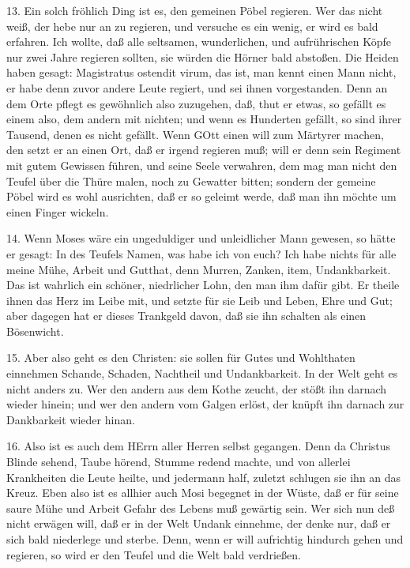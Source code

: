 13. Ein solch fröhlich Ding ist es, den gemeinen Pöbel regieren. Wer das nicht weiß, der hebe nur an zu regieren, und versuche es ein wenig, er wird es bald erfahren. Ich wollte, daß alle seltsamen, wunderlichen, und aufrührischen Köpfe nur zwei Jahre regieren sollten, sie würden die Hörner bald abstoßen. Die Heiden haben gesagt: Magistratus ostendit virum, das ist, man kennt einen Mann nicht, er habe denn zuvor andere Leute regiert, und sei ihnen vorgestanden. Denn an dem Orte pflegt es gewöhnlich also zuzugehen, daß, thut er etwas, so gefällt es einem also, dem andern mit nichten; und wenn es Hunderten gefällt, so sind ihrer Tausend, denen es nicht gefällt. Wenn GOtt einen will zum Märtyrer machen, den setzt er an einen Ort, daß er irgend regieren muß; will er denn sein Regiment mit gutem Gewissen führen, und seine Seele verwahren, dem mag man nicht den Teufel über die Thüre malen, noch zu Gewatter bitten; sondern der gemeine Pöbel wird es wohl ausrichten, daß er so geleimt werde, daß man ihn möchte um einen Finger wickeln.

14. Wenn Moses wäre ein ungeduldiger und unleidlicher Mann gewesen, so hätte er gesagt: In des Teufels Namen, was habe ich von euch? Ich habe nichts für alle meine Mühe, Arbeit und Gutthat, denn Murren, Zanken, item, Undankbarkeit. Das ist wahrlich ein schöner, niedrlicher Lohn, den man ihm dafür gibt. Er theile ihnen das Herz im Leibe mit, und setzte für sie Leib und Leben, Ehre und Gut; aber dagegen hat er dieses Trankgeld davon, daß sie ihn schalten als einen Bösenwicht.

15. Aber also geht es den Christen: sie sollen für Gutes und Wohlthaten einnehmen Schande, Schaden, Nachtheil und Undankbarkeit. In der Welt geht es nicht anders zu. Wer den andern aus dem Kothe zeucht, der stößt ihn darnach wieder hinein; und wer den andern vom Galgen erlöst, der knüpft ihn darnach zur Dankbarkeit wieder hinan.

16. Also ist es auch dem HErrn aller Herren selbst gegangen. Denn da Christus Blinde sehend, Taube hörend, Stumme redend machte, und von allerlei Krankheiten die Leute heilte, und jedermann half, zuletzt schlugen sie ihn an das Kreuz. Eben also ist es allhier auch Mosi begegnet in der Wüste, daß er für seine saure Mühe und Arbeit Gefahr des Lebens muß gewärtig sein. Wer sich nun deß nicht erwägen will, daß er in der Welt Undank einnehme, der denke nur, daß er sich bald niederlege und sterbe. Denn, wenn er will aufrichtig hindurch gehen und regieren, so wird er den Teufel und die Welt bald verdrießen.

